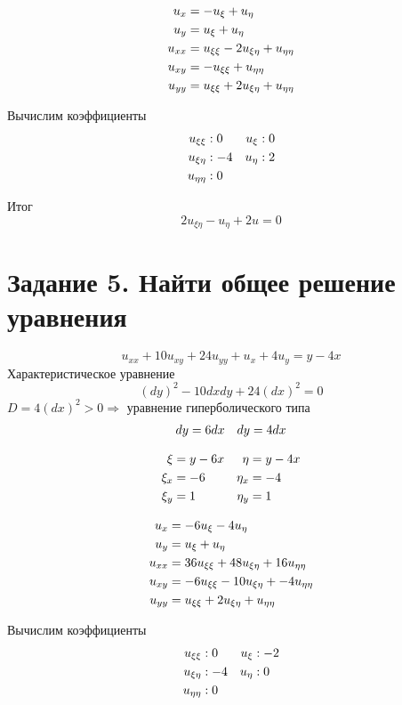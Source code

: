 \documentclass[12pt]{article}
\begin{document}
\begin{align}
u_x &= -u_\xi + u_\eta \notag \\
u_y &= u_\xi + u_\eta \notag \\
u_{xx} &= u_{\xi\xi} - 2u_{\xi\eta} + u_{\eta\eta} \notag \\
u_{xy} &= -u_{\xi\xi} + u_{\eta\eta} \notag \\
u_{yy} &= u_{\xi\xi} + 2u_{\xi\eta} + u_{\eta\eta} \notag
\end{align}

Вычислим коэффициенты
\begin{align}
    u_{\xi\xi} &: 0 &u_\xi &: 0 \notag \\
    u_{\xi\eta} &: -4 &u_\eta &: 2 \notag \\
    u_{\eta\eta} &: 0 \notag
\end{align}

Итог
$$2u_{\xi\eta} - u_\eta + 2u = 0$$

\section{Задание 5. Найти общее решение уравнения}
$$u_{xx} + 10u_{xy} + 24u_{yy} + u_x + 4u_y = y-4x$$
Характеристическое уравнение
$$(dy)^2 - 10dxdy + 24(dx)^2 = 0$$
$D = 4(dx)^2 > 0 \Rightarrow$ уравнение гиперболического типа
\begin{align}
dy &= 6dx &dy = 4dx \notag
\end{align}

\begin{align}
\xi &= y - 6x &\eta &= y-4x \notag \\
\xi_x &= -6 &\eta_x &= -4 \notag \\
\xi_y &= 1 &\eta_y &= 1 \notag
\end{align}

\begin{align}
    u_x &= -6u_\xi - 4u_\eta \notag \\
    u_y &= u_\xi + u_\eta \notag \\
    u_{xx} &= 36u_{\xi\xi} + 48u_{\xi\eta} + 16u_{\eta\eta} \notag \\
    u_{xy} &= -6u_{\xi\xi} - 10u_{\xi\eta} + -4u_{\eta\eta} \notag \\
    u_{yy} &= u_{\xi\xi} + 2u_{\xi\eta} + u_{\eta\eta} \notag
\end{align}

Вычислим коэффициенты
\begin{align}
u_{\xi\xi} &: 0 &u_\xi &: -2 \notag \\
u_{\xi\eta} &: -4 &u_\eta &: 0 \notag \\
u_{\eta\eta} &: 0 \notag
\end{align}
\end{document}
